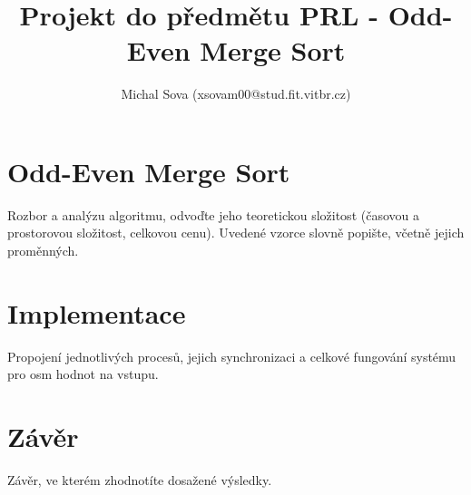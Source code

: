 \documentclass[12pt,a4paper]{article}
\title{Projekt do předmětu PRL - Odd-Even Merge Sort}
\author{Michal Sova (xsovam00@stud.fit.vitbr.cz)}
\begin{document}
\maketitle

\section{Odd-Even Merge Sort}
\label{sec:odd_even_merge_sort}
Rozbor a analýzu algoritmu, odvoďte jeho teoretickou složitost (časovou a prostorovou složitost, celkovou cenu). Uvedené vzorce slovně popište, včetně jejich proměnných.


\section{Implementace}
\label{sec:implementace}
Propojení jednotlivých procesů, jejich synchronizaci a celkové fungování systému pro osm hodnot na vstupu.


\section{Závěr}
\label{sec:závěr}
Závěr, ve kterém zhodnotíte dosažené výsledky.
\end{document}
